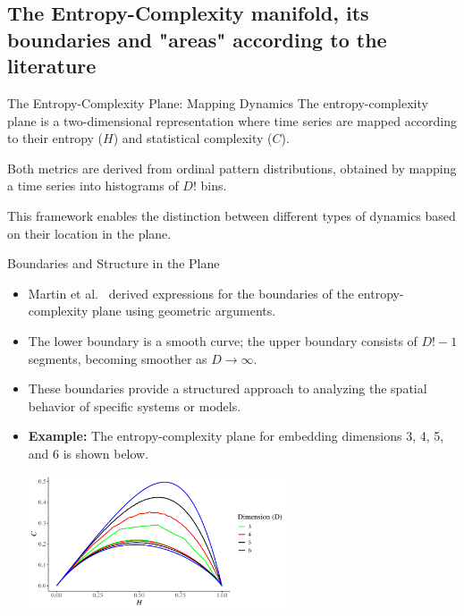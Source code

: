 \documentclass{beamer}
\begin{document}
\subsection{The Entropy-Complexity manifold, its boundaries and "areas" according to the literature}
\begin{frame}{The Entropy-Complexity Plane: Mapping Dynamics}
	The \alert{entropy-complexity plane} is a two-dimensional representation where time series are mapped according to their entropy ($H$) and statistical complexity ($C$).
	
	 Both metrics are derived from ordinal pattern distributions, obtained by mapping a time series into histograms of $D!$ bins.
	 
	This framework enables the distinction between different types of dynamics based on their location in the plane.
\end{frame}


\begin{frame}{Boundaries and Structure in the Plane}
	\begin{itemize}
		\item Martin et al.~\cite{Martin2006} derived expressions for the boundaries of the entropy-complexity plane using geometric arguments.
		\item The \alert{lower boundary} is a smooth curve; the \alert{upper boundary} consists of $D!-1$ segments, becoming smoother as $D \to \infty$.
		\item These boundaries provide a structured approach to analyzing the spatial behavior of specific systems or models.
		\item \textbf{Example:} The entropy-complexity plane for embedding dimensions 3, 4, 5, and 6 is shown below.
		\begin{center}
			\includegraphics[width=0.6\textwidth]{complexity plane}
		\end{center}
	\end{itemize}
\end{frame}
\end{document}
